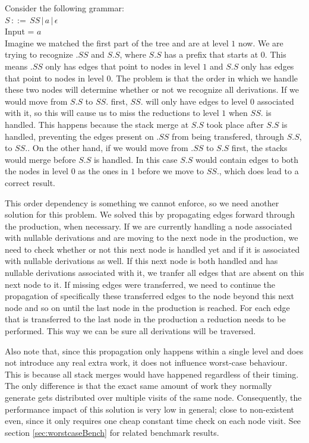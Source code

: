 \documentclass[a4paper,10pt]{article}
\begin{document}
Consider the following grammar:\\
$S\,::=\,SS\,|\,a\,|\,\epsilon$\\
Input = $a$\\
Imagine we matched the first part of the tree and are at level $1$ now. We are trying to recognize $.SS$ and $S.S$, where $S.S$ has a prefix that starts at $0$. This means $.SS$ only has edges that point to nodes in level $1$ and $S.S$ only has edges that point to nodes in level $0$. The problem is that the order in which we handle these two nodes will determine whether or not we recognize all derivations. If we would move from $S.S$ to $SS.$ first, $SS.$ will only have edges to level $0$ associated with it, so this will cause us to miss the reductions to level $1$ when $SS.$ is handled. This happens because the stack merge at $S.S$ took place after $S.S$ is handled, preventing the edges present on $.SS$ from being transfered, through $S.S$, to $SS.$. On the other hand, if we would move from $.SS$ to $S.S$ first, the stacks would merge before $S.S$ is handled. In this case $S.S$ would contain edges to both the nodes in level $0$ as the ones in $1$ before we move to $SS.$, which does lead to a correct result.

This order dependency is something we cannot enforce, so we need another solution for this problem. We solved this by propagating edges forward through the production, when necessary. If we are currently handling a node associated with nullable derivations and are moving to the next node in the production, we need to check whether or not this next node is handled yet and if it is associated with nullable derivations as well. If this next node is both handled and has nullable derivations associated with it, we tranfer all edges that are absent on this next node to it. If missing edges were transferred, we need to continue the propagation of specifically these transferred edges to the node beyond this next node and so on until the last node in the production is reached. For each edge that is transferred to the last node in the production a reduction needs to be performed. This way we can be sure all derivations will be traversed.

Also note that, since this propagation only happens within a single level and does not introduce any real extra work, it does not influence worst-case behaviour. This is because all stack merges would have happened regardless of their timing. The only difference is that the exact same amount of work they normally generate gets distributed over multiple visits of the same node. Consequently, the performance impact of this solution is very low in general; close to non-existent even, since it only requires one cheap constant time check on each node visit. See section \ref{sec:worstcaseBench} for related benchmark results.
\end{document}
